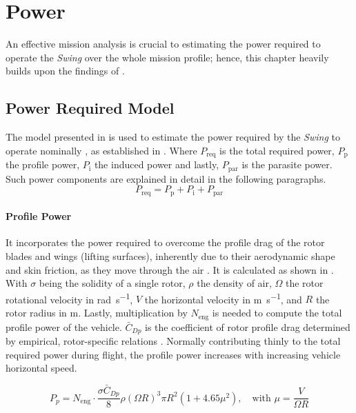 \chapter{Power}
\label{ch:Power}
An effective mission analysis is crucial to estimating the power required to operate the \textit{Swing} over the whole mission profile; hence, this chapter heavily builds upon the findings of .

\section{Power Required Model}
\label{subsec:powermodel}
The model presented in  is used to estimate the power required by the \textit{Swing} to operate nominally \cite{helicoptercourseMarilena}, as established in .
Where $P_{\text{req}}$ is the total required power, $P_{\text{p}}$ the profile power, $P_{\text{i}}$ the induced power and lastly, $P_{\text{par}}$ is the parasite power. Such power components are explained in detail in the following paragraphs.
\begin{equation}
\label{eq:powermodel}
    P_{\text{req}}=P_{\text{p}}+P_{\text{i}}+P_{\text{par}}
\end{equation}

\subsubsection{Profile Power} 
It incorporates the power required to overcome the profile drag of the rotor blades and wings (lifting surfaces), inherently due to their aerodynamic shape and skin friction, as they move through the air \cite{helicoptercourseMarilena}.
It is calculated as shown in . 
With $\sigma$ being the solidity of a single rotor, $\rho$ the density of air, $\Omega$ the rotor rotational velocity in \unit{rad\per\s}, $V$ the horizontal velocity in \unit{m\per\s}, and $R$ the rotor radius in \unit{m}.
Lastly, multiplication by $N_{\text{eng}}$ is needed to compute the total profile power of the vehicle. $\bar{C}_{Dp}$ is the coefficient of rotor profile drag determined by empirical, rotor-specific relations \cite{HelicopterFlight}.
Normally contributing thinly to the total required power during flight, the profile power increases with increasing vehicle horizontal speed. 

\begin{equation}
\label{eq:profilepower}
    P_p=N_{\text{eng}}\cdot\frac{\sigma \bar{C}_{Dp}}{8} \rho(\Omega R)^3 \pi R^2\left(1+4.65 \mu^2\right),\quad\text{with }\mu=\frac{V}{\Omega R}
\end{equation}


